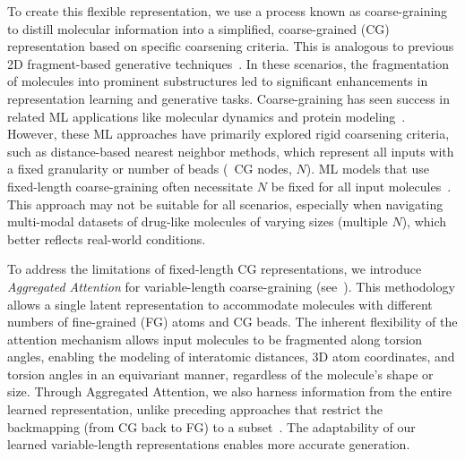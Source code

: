 To create this flexible representation, we use a process known as coarse-graining to distill molecular information into a simplified, coarse-grained (CG) representation based on specific coarsening criteria. This is analogous to previous 2D fragment-based generative techniques~\citep{FaST}. In these scenarios, the fragmentation of molecules into prominent substructures led to significant enhancements in representation learning and generative tasks.
Coarse-graining has seen success in related ML applications like molecular dynamics and protein modeling~\citep{CG-MD, CGProt-background}. However, these ML approaches have primarily explored rigid coarsening criteria, such as distance-based nearest neighbor methods, which represent all inputs with a fixed granularity or number of beads (\ie\ CG nodes, $N$). 
ML models that use fixed-length coarse-graining often necessitate $N$ be fixed for all input molecules~\citep{CGProtein}. 
This approach may not be suitable for all scenarios, especially when navigating multi-modal datasets of drug-like molecules of varying sizes (multiple $N$), which better reflects real-world conditions.

To address the limitations of fixed-length CG representations, we introduce \textit{Aggregated Attention} for variable-length coarse-graining (see~). 
This methodology allows a single latent representation to accommodate molecules with different numbers of fine-grained (FG) atoms and CG beads.
The inherent flexibility of the attention mechanism allows input molecules to be fragmented along torsion angles, enabling the modeling of interatomic distances, 3D atom coordinates, and torsion angles in an equivariant manner, regardless of the molecule's shape or size.
Through Aggregated Attention, we also harness information from the entire learned representation, unlike preceding approaches that restrict the backmapping (from CG back to FG) to a subset~\citep{CGVAE}. %
The adaptability of our learned variable-length representations enables more accurate generation.

